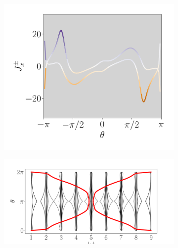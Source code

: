 \begin{figure}[h!]
     
     \begin{minipage}[h!]{1\textwidth}
         \begin{subfigure}[b!]{0.37 \textwidth}
             \caption{}
             \includegraphics[width=\textwidth]{Imagenes/Resultados_pump_Fractal/y/current_square_pump_pny.pdf}
             \label{}
         \end{subfigure}\hspace{-0.5em}
         \begin{subfigure}[b!]{0.63 \textwidth}
             \caption{}
             \includegraphics[width=\textwidth]{Imagenes/Resultados_pump_Fractal/y/wannier_centery.pdf}
             \label{}
         \end{subfigure}\hspace*{-0.5em}
     \end{minipage}\vspace*{-1em}
     
     
    \caption{}
    \label{fig:Pump_fractal_y}
\end{figure}